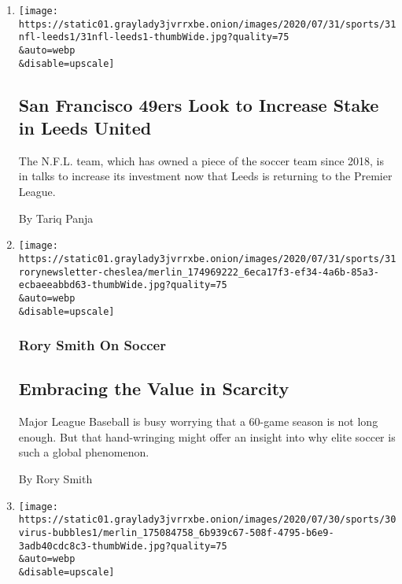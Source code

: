 \begin{enumerate}
\def\labelenumi{\arabic{enumi}.}
\item
  \href{/2020/07/31/sports/soccer/leeds-united-san-francisco-49ers.html}{}

  \texttt{[image: https://static01.graylady3jvrrxbe.onion/images/2020/07/31/sports/31nfl-leeds1/31nfl-leeds1-thumbWide.jpg?quality=75\\\&auto=webp\\\&disable=upscale]}

  \hypertarget{san-francisco-49ers-look-to-increase-stake-in-leeds-united}{%
  \subsection{San Francisco 49ers Look to Increase Stake in Leeds
  United}\label{san-francisco-49ers-look-to-increase-stake-in-leeds-united}}

  The N.F.L. team, which has owned a piece of the soccer team since
  2018, is in talks to increase its investment now that Leeds is
  returning to the Premier League.

  By Tariq Panja
\item
  \href{/2020/07/31/sports/soccer/soccer-baseball.html}{}

  \texttt{[image: https://static01.graylady3jvrrxbe.onion/images/2020/07/31/sports/31rorynewsletter-cheslea/merlin\_174969222\_6eca17f3-ef34-4a6b-85a3-ecbaeeabbd63-thumbWide.jpg?quality=75\\\&auto=webp\\\&disable=upscale]}

  \hypertarget{rory-smith-on-soccer}{%
  \subsubsection{Rory Smith On Soccer}\label{rory-smith-on-soccer}}

  \hypertarget{embracing-the-value-in-scarcity}{%
  \subsection{Embracing the Value in
  Scarcity}\label{embracing-the-value-in-scarcity}}

  Major League Baseball is busy worrying that a 60-game season is not
  long enough. But that hand-wringing might offer an insight into why
  elite soccer is such a global phenomenon.

  By Rory Smith
\item
  \href{/2020/07/30/sports/basketball/sports-bubble-nba-mlb.html}{}

  \texttt{[image: https://static01.graylady3jvrrxbe.onion/images/2020/07/30/sports/30virus-bubbles1/merlin\_175084758\_6b939c67-508f-4795-b6e9-3adb40cdc8c3-thumbWide.jpg?quality=75\\\&auto=webp\\\&disable=upscale]}


\end{enumerate}
